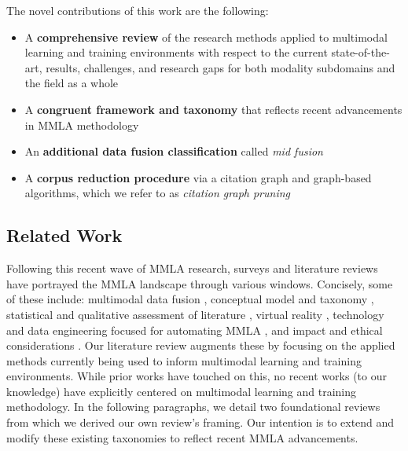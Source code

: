 \documentclass[manuscript,screen,review]{acmart}
\begin{document}
The novel contributions of this work are the following: 
\begin{itemize}
    \item A \textbf{comprehensive review} of the research methods applied to multimodal learning and training environments with respect to the current state-of-the-art, results, challenges, and research gaps for both modality subdomains and the field as a whole
    \item A \textbf{congruent framework and taxonomy} that reflects recent advancements in MMLA methodology
    \item An \textbf{additional data fusion classification} called \textit{mid fusion}
    \item A \textbf{corpus reduction procedure} via a citation graph and graph-based algorithms, which we refer to as \textit{citation graph pruning}
\end{itemize}

\subsection{Related Work} \label{subsec:related_work}

Following this recent wave of MMLA research, surveys and literature reviews have portrayed the MMLA landscape through various windows. Concisely, some of these include: multimodal data fusion \cite{chango_review_nodate}, conceptual model and taxonomy \cite{di_mitri_signals_2018}, statistical and qualitative assessment of literature \cite{sharma_multimodal_2020, qushem_trends_nodate}, virtual reality \cite{philippe_multimodal_2020}, technology and data engineering focused for automating MMLA \cite{chua_technologies_2019}, and impact and ethical considerations \cite{alwahaby_evidence_2021}. Our literature review augments these by focusing on the applied methods currently being used to inform multimodal learning and training environments. While prior works have touched on this, no recent works (to our knowledge) have explicitly centered on multimodal learning and training methodology. In the following paragraphs, we detail two foundational reviews from which we derived our own review's framing. Our intention is to extend and modify these existing taxonomies to reflect recent MMLA advancements. 
\end{document}

